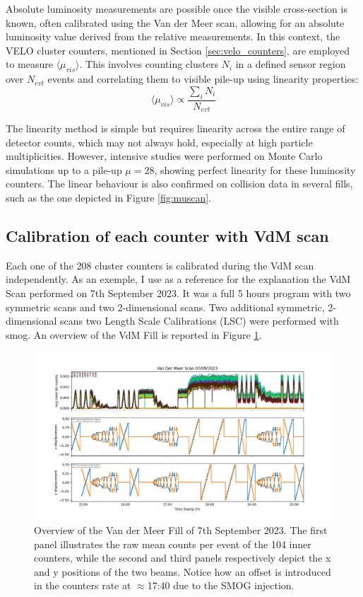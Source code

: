 Absolute luminosity measurements are possible once the visible cross-section is known, often calibrated using the Van der Meer scan, allowing for an absolute luminosity value derived from the relative measurements. In this context, the VELO cluster counters, mentioned in Section \ref{sec:velo_counters}, are employed to measure  $\langle\mu_{vis}\rangle$. This involves counting clusters $N_i$ in a defined sensor region over $N_{evt}$ events and correlating them to visible pile-up using linearity properties:
\begin{equation}
    \langle\mu_{vis}\rangle\propto \frac{\sum_i N_i}{N_{evt}}
\end{equation}

The linearity method is simple but requires linearity across the entire range of detector counts, which may not always hold, especially at high particle multiplicities. However, intensive studies were performed on Monte Carlo simulations up to a pile-up $\mu = 28$, showing perfect linearity for these luminosity counters\cite{dan}. The linear behaviour is also confirmed on collision data in several fills, such as the one depicted in Figure \ref{fig:muscan}.

\subsection{Calibration of each counter with VdM scan}
Each one of the 208 cluster counters is calibrated during the VdM scan independently. As an exemple, I use as a reference for the explanation the VdM Scan performed on 7th September 2023. 
It was a full 5 hours program with two symmetric scans and two 2-dimensional scans. Two additional symmetric, 2-dimensional scans two Length Scale Calibrations (LSC) were performed with smog. An overview of the VdM Fill is reported in Figure \ref{fig:inner_vdm_sep}.

\begin{figure}
    \centering
    \includegraphics[width=\textwidth]{figures/inner_counts_bkg.png}
    \caption{Overview of the Van der Meer Fill of 7th September 2023. The first panel illustrates the raw mean counts per event of the 104 inner counters, while the second and third panels respectively depict the x and y positions of the two beams. Notice how an offset is introduced in the counters rate at $\approx$17:40 due to the SMOG injection.}
    \label{fig:inner_vdm_sep}
\end{figure}




